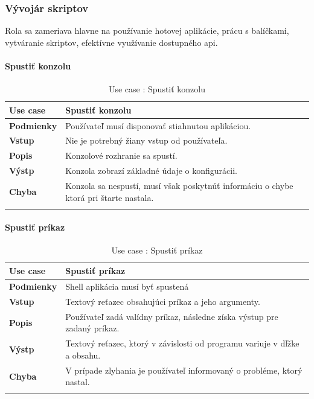 \subsubsection{Vývojár skriptov}
\indent Rola sa zameriava hlavne na používanie hotovej aplikácie, prácu s balíčkami, vytváranie skriptov, efektívne využívanie dostupného \gls{api}. 
\paragraph{Spustiť konzolu}
\begin{center}
	\begin{longtable}{|p{2.5cm}|p{14cm}|}
		\hline
		\textbf{Use case} & Spustiť konzolu \\ 
		\hline
		\textbf{Podmienky} & Používateľ musí disponovať stiahnutou aplikáciou.\\
		\hline
		\textbf{Vstup} & Nie je potrebný žiany vstup od používateľa.\\
		\hline
		\textbf{Popis} & Konzolové rozhranie sa spustí. \\ 
		\hline
		\textbf{Výstp} & Konzola zobrazí základné údaje o konfigurácii.\\
		\hline
		\textbf{Chyba} & Konzola sa nespustí, musí však poskytnúť informáciu o chybe ktorá pri štarte nastala.\\
		\hline
	\caption{Use case : Spustiť konzolu}
	\label{table:1}
	\end{longtable}
\end{center}

\paragraph{Spustiť príkaz}
\begin{center}
	\begin{longtable}{|p{2.5cm}|p{14cm}|}
		\hline
		\textbf{Use case} & Spustiť príkaz \\ 
		\hline
		\textbf{Podmienky} & Shell aplikácia musí byť spustená \\ 
		\hline
		\textbf{Vstup} & Textový reťazec obsahujúci príkaz a jeho argumenty.\\
		\hline
		\textbf{Popis} & Používateľ zadá valídny príkaz, následne získa výstup pre zadaný príkaz. \\ 
		\hline
		\textbf{Výstp} & Textový reťazec, ktorý v závislosti od programu variuje v dľžke a obsahu.\\
		\hline
		\textbf{Chyba} & V prípade zlyhania je používateľ informovaný o probléme, ktorý nastal.\\
		\hline
		\caption{Use case : Spustiť príkaz}
		\label{table:1}
	\end{longtable}
	
\end{center}
